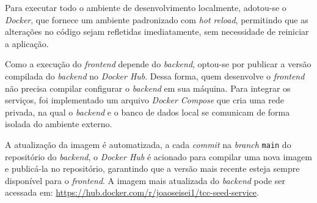 Para executar todo o ambiente de desenvolvimento localmente, adotou-se o \textit{Docker}, que fornece um ambiente padronizado com \textit{hot reload}, permitindo que as alterações no código sejam refletidas imediatamente, sem necessidade de reiniciar a aplicação.

Como a execução do \textit{frontend} depende do \textit{backend}, optou-se por publicar a versão compilada do \textit{backend} no \textit{Docker Hub}. Dessa forma, quem desenvolve o \textit{frontend} não precisa compilar configurar o \textit{backend} em sua máquina. Para integrar os serviços, foi implementado um arquivo \textit{Docker Compose} que cria uma rede privada, na qual o \textit{backend} e o banco de dados local se comunicam de forma isolada do ambiente externo.

A atualização da imagem é automatizada, a cada \textit{commit} na \textit{branch} \texttt{main} do repositório do \textit{backend}, o \textit{Docker Hub} é acionado para compilar uma nova imagem e publicá-la no repositório, garantindo que a versão mais recente esteja sempre disponível para o \textit{frontend}. A imagem mais atualizada do \textit{backend} pode ser acessada em: \url{https://hub.docker.com/r/joaoseisei1/tcc-seed-service}.